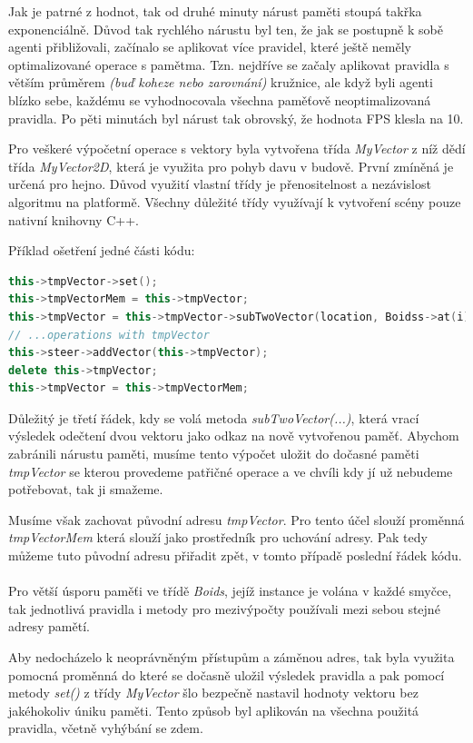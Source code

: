 \documentclass[czech,public,dept460,male,cpdeclaration]{diploma}
\begin{document}
Jak je patrné z hodnot, tak od druhé minuty nárust paměti stoupá takřka exponenciálně. Důvod tak rychlého nárustu byl ten, že jak se postupně k sobě agenti přibližovali, začínalo se aplikovat více pravidel, které ještě neměly optimalizované operace s pamětma. Tzn. nejdříve se začaly aplikovat pravidla s větším průměrem \textit{(buď koheze nebo zarovnání)} kružnice, ale když byli agenti blízko sebe, každému se vyhodnocovala všechna paměťově neoptimalizovaná pravidla.
Po pěti minutách byl nárust tak obrovský, že hodnota FPS klesla na 10. 

Pro veškeré výpočetní operace s vektory byla vytvořena třída \textit{MyVector} z níž dědí třída \textit{MyVector2D}, která je využita pro pohyb davu v budově. První zmíněná je určená pro hejno. Důvod využití vlastní třídy je přenositelnost a nezávislost algoritmu na platformě. Všechny důležité třídy využívají k vytvoření scény pouze nativní knihovny C++.

Příklad ošetření jedné části kódu:

\begin{lstlisting}[language=c++,label=src:memory elimination,caption=Ukázka eliminace nárustu paměti]
this->tmpVector->set();
this->tmpVectorMem = this->tmpVector;
this->tmpVector = this->tmpVector->subTwoVector(location, Boidss->at(i)->location);
// ...operations with tmpVector
this->steer->addVector(this->tmpVector);
delete this->tmpVector;
this->tmpVector = this->tmpVectorMem;
\end{lstlisting}

Důležitý je třetí řádek, kdy se volá metoda \textit{subTwoVector(...)}, která vrací výsledek odečtení dvou vektoru jako odkaz na nově vytvořenou paměť. Abychom zabránili nárustu paměti, musíme tento výpočet uložit do dočasné paměti \textit{tmpVector} se kterou provedeme patřičné operace a ve chvíli kdy jí už nebudeme potřebovat, tak ji smažeme.

Musíme však zachovat původní adresu \textit{tmpVector}. Pro tento účel slouží proměnná \\\textit{tmpVectorMem} která slouží jako prostředník pro uchování adresy. Pak tedy můžeme tuto původní adresu přiřadit zpět, v tomto případě poslední řádek kódu.
\\\\
Pro větší úsporu paměťi ve třídě \textit{Boids}, jejíž instance je volána v každé smyčce, tak jednotlivá pravidla i metody pro mezivýpočty používali mezi sebou stejné adresy pamětí.

Aby nedocházelo k neoprávněným přístupům a záměnou adres, tak byla využita pomocná proměnná do které se dočasně uložil výsledek pravidla a pak pomocí metody \textit{set()} z třídy \textit{MyVector} šlo bezpečně nastavil hodnoty vektoru bez jakéhokoliv úniku paměti. Tento způsob byl aplikován na všechna použitá pravidla, včetně vyhýbání se zdem.
\end{document}
